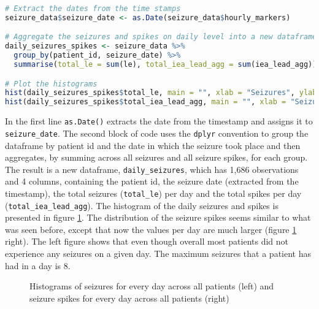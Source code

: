 \begin{lstlisting}[language=R]
# Extract the dates from the time stamps
seizure_data$seizure_date <- as.Date(seizure_data$hourly_markers)

# Aggregate the seizures and spikes on daily level into a new dataframe
daily_seizures_spikes <- seizure_data %>%
  group_by(patient_id, seizure_date) %>%
  summarise(total_le = sum(le), total_iea_lead_agg = sum(iea_lead_agg))

# Plot the histograms
hist(daily_seizures_spikes$total_le, main = "", xlab = "Seizures", ylab = "Density", freq=FALSE)
hist(daily_seizures_spikes$total_iea_lead_agg, main = "", xlab = "Seizure Spikes", ylab = "Density", freq=FALSE)
\end{lstlisting}
In the first line \verb|as.Date()| extracts the date from the timestamp and assigns it to \verb|seizure_date|. The second block of code uses the \verb|dplyr| convention to group the dataframe by patient id and the date in which the seizure took place and then aggregates, by summing across all seizures and all seizure spikes, for each group. The result is a new dataframe, \verb|daily_seizures|, which has 1,686 observations and 4 columns, containing the patient id, the seizure date (extracted from the timestamp), the total seizures (\verb|total_le|) per day and the total spikes per day (\verb|total_iea_lead_agg|). The histogram of the daily seizures and spikes is presented in figure \ref{fig:daily_seizures}. The distribution of the seizure spikes seems similar to what was seen before, except that now the values per day are much larger (figure \ref{fig:daily_seizures} right). The left figure shows that even though overall most patients did not experience any seizures on a given day. The maximum seizures that a patient has had in a day is $8$.
\begin{figure}[H]
  \begin{minipage}[b]{0.5\linewidth}
    \centering

  \end{minipage}
  \begin{minipage}[b]{0.5\linewidth}
    \centering
  \end{minipage}
  \label{fig:daily_seizures}
  \caption{Histograms of seizures for every day across all patients (left) and seizure spikes for every day across all patients (right)}
\end{figure}

